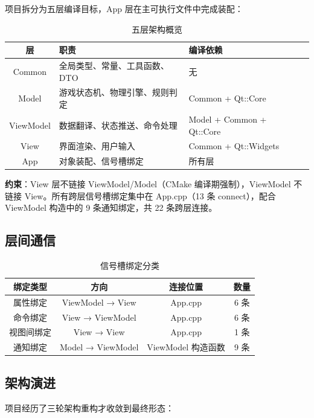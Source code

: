 \documentclass[11pt]{ctexart}
\begin{document}
项目拆分为五层编译目标，App 层在主可执行文件中完成装配：

\begin{table}[H]
\centering
\begin{tabular}{|c|l|l|l|}
\hline
\textbf{层} & \textbf{职责} & \textbf{编译依赖} \\
\hline
Common     & 全局类型、常量、工具函数、DTO       & 无                       \\
Model      & 游戏状态机、物理引擎、规则判定     & Common + Qt::Core      \\
ViewModel  & 数据翻译、状态推送、命令处理       & Model + Common + Qt::Core \\
View       & 界面渲染、用户输入                 & Common + Qt::Widgets    \\
App        & 对象装配、信号槽绑定               & 所有层                   \\
\hline
\end{tabular}
\caption{五层架构概览}
\end{table}

\textbf{约束}：View 层不链接 ViewModel/Model（CMake 编译期强制），ViewModel 不链接 View。所有跨层信号槽绑定集中在 App.cpp（13 条 connect），配合 ViewModel 构造中的 9 条通知绑定，共 22 条跨层连接。

\subsection{层间通信}

\begin{table}[H]
\centering
\begin{tabular}{|c|c|c|c|}
\hline
\textbf{绑定类型} & \textbf{方向} & \textbf{连接位置} & \textbf{数量} \\
\hline
属性绑定 & ViewModel → View & App.cpp & 6 条 \\
命令绑定 & View → ViewModel & App.cpp & 6 条 \\
视图间绑定 & View → View & App.cpp & 1 条 \\
通知绑定 & Model → ViewModel & ViewModel 构造函数 & 9 条 \\
\hline
\end{tabular}
\caption{信号槽绑定分类}
\end{table}

\subsection{架构演进}

项目经历了三轮架构重构才收敛到最终形态：
\end{document}
